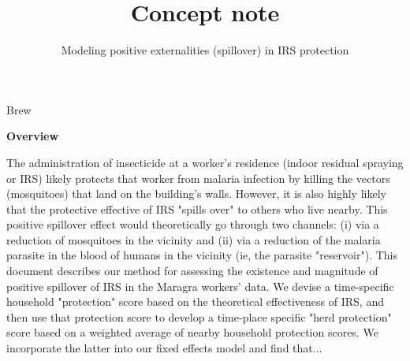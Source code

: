 \documentclass[]{article}
\title{Concept note}
\subtitle{Modeling positive externalities (spillover) in IRS protection}
\author{}
\date{}
\begin{document}
\maketitle

\begin{center}
\begin{large}

Brew

\end{large}
\end{center}

\vspace{5mm}

\begin{center}
\textbf{Overview}  
\end{center}

\vspace{5mm}

\begin{center}
\begin{changemargin}{3cm}{3cm} 

The administration of insecticide at a worker's residence (indoor residual spraying or IRS) likely protects that worker from malaria infection by killing the vectors (mosquitoes) that land on the building's walls. However, it is also highly likely that the protective effective of IRS "spills over" to others who live nearby. This positive spillover effect would theoretically go through two channels: (i) via a reduction of mosquitoes in the vicinity and (ii) via a reduction of the malaria parasite in the blood of humans in the vicinity (ie, the parasite "reservoir"). This document describes our method for assessing the existence and magnitude of positive spillover of IRS in the Maragra workers' data. We devise a time-specific household "protection" score based on the theoretical effectiveness of IRS, and then use that protection score to develop a time-place specific "herd protection" score based on a weighted average of nearby household protection scores. We incorporate the latter into our fixed effects model and find that...

\end{changemargin}
\end{center}

\vspace{20mm}
\end{document}
